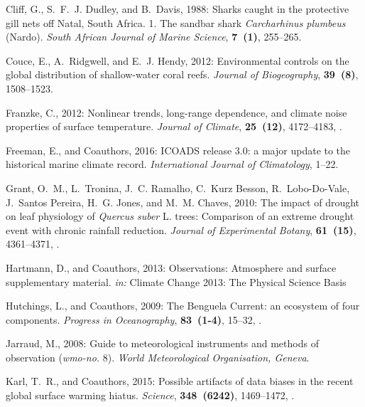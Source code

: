 \documentclass[twocol]{ametsoc}
\begin{document}
\begin{thebibliography}{41}
Cliff, G., S.~F.~J. Dudley, and B.~Davis, 1988: {Sharks caught in the
  protective gill nets off Natal, South Africa. 1. The sandbar shark
  \textit{Carcharhinus plumbeus} (Nardo)}. \textit{South African Journal of Marine
  Science}, \textbf{7~(1)}, 255--265.

Couce, E., A.~Ridgwell, and E.~J. Hendy, 2012: {Environmental controls on the
  global distribution of shallow-water coral reefs}. \textit{Journal of
  Biogeography}, \textbf{39~(8)}, 1508--1523.

Franzke, C., 2012: {Nonlinear trends, long-range dependence, and climate noise
  properties of surface temperature}. \textit{Journal of Climate},
  \textbf{25~(12)}, 4172--4183, .

Freeman, E., and Coauthors, 2016: {ICOADS release 3.0: a major update to the
  historical marine climate record}. \textit{International Journal of
  Climatology}, 1--22.

Grant, O.~M., L.~Tronina, J.~C. Ramalho, C.~{Kurz Besson}, R.~Lobo-Do-Vale,
  J.~{Santos Pereira}, H.~G. Jones, and M.~M. Chaves, 2010: {The impact of
  drought on leaf physiology of \textit{Quercus suber} L. trees: Comparison of an
  extreme drought event with chronic rainfall reduction}. \textit{Journal of
  Experimental Botany}, \textbf{61~(15)}, 4361--4371, .

Hartmann, D., and Coauthors, 2013: Observations: Atmosphere and surface
  supplementary material. \textit{in:} Climate Change 2013: The Physical Science Basis

Hutchings, L., and Coauthors, 2009: {The Benguela Current: an ecosystem of four
  components}. \textit{Progress in Oceanography}, \textbf{83~(1-4)}, 15--32,
  .

Jarraud, M., 2008: Guide to meteorological instruments and methods of
  observation (\textit{wmo-no.} 8). \textit{World Meteorological Organisation, Geneva}.

Karl, T.~R., and Coauthors, 2015: {Possible artifacts of data biases in the
  recent global surface warming hiatus}. \textit{Science}, \textbf{348~(6242)},
  1469--1472, .


\end{thebibliography}
\end{document}
